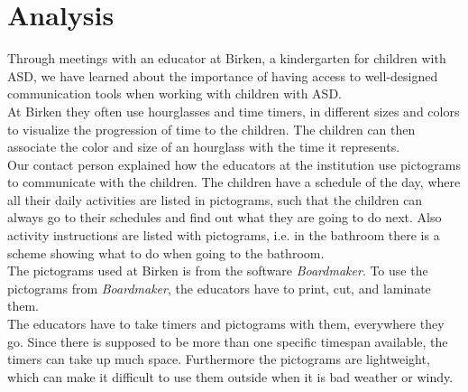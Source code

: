 \chapter{Analysis}
Through meetings with an educator at Birken, a kindergarten for children with ASD, we have learned about the importance of having access to well-designed communication tools when working with children with ASD.\\

At Birken they often use hourglasses and time timers, in different sizes and colors to visualize the progression of time to the children. The children can then associate the color and size of an hourglass with the time it represents.\\
Our contact person explained how the educators at the institution use pictograms to communicate with the children. The children have a schedule of the day, where all their daily activities are listed in pictograms, such that the children can always go to their schedules and find out what they are going to do next. Also activity instructions are listed with pictograms, i.e. in the bathroom there is a scheme showing what to do when going to the bathroom.\\
The pictograms used at Birken is from the software \textit{Boardmaker}\cite{web:boardmaker}. To use the pictograms from \textit{Boardmaker}, the educators have to print, cut, and laminate them.\\

The educators have to take timers and pictograms with them, everywhere they go. Since there is supposed to be more than one specific timespan available, the timers can take up much space. Furthermore the pictograms are lightweight, which can make it difficult to use them outside when it is bad weather or windy.